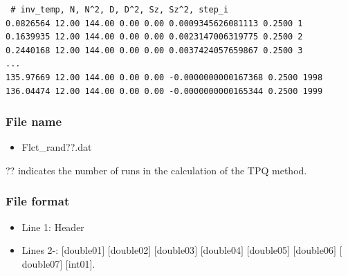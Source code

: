 \begin{minipage}{15cm}
\begin{screen}
\begin{verbatim}
 # inv_temp, N, N^2, D, D^2, Sz, Sz^2, step_i
0.0826564 12.00 144.00 0.00 0.00 0.0009345626081113 0.2500 1
0.1639935 12.00 144.00 0.00 0.00 0.0023147006319775 0.2500 2
0.2440168 12.00 144.00 0.00 0.00 0.0037424057659867 0.2500 3
...
135.97669 12.00 144.00 0.00 0.00 -0.0000000000167368 0.2500 1998
136.04474 12.00 144.00 0.00 0.00 -0.0000000000165344 0.2500 1999
\end{verbatim}
\end{screen}
\end{minipage}

\subsubsection{File name}
 \begin{itemize}
   \item Flct\_rand??.dat
  \end{itemize}
  ?? indicates the number of runs in the calculation of the TPQ method.

\subsubsection{File format}
\begin{itemize}
   \item Line 1: Header
   \item Lines 2-: $[$double01$]$ $[$double02$]$ $[$double03$]$ $[$double04$]$ $[$double05$]$ $[$double06$]$ $[$double07$]$ $[$int01$]$.
  \end{itemize}

